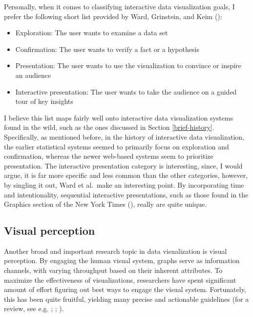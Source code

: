 \documentclass[
  openany]{book}
\providecommand{\tightlist}{%
  \setlength{\itemsep}{0pt}\setlength{\parskip}{0pt}}
\theoremstyle{definition}
\theoremstyle{definition}
\theoremstyle{definition}
\theoremstyle{definition}
\theoremstyle{remark}
\begin{document}
Personally, when it comes to classifying interactive data visualization goals, I prefer the following short list provided by Ward, Grinstein, and Keim ():

\begin{itemize}
\tightlist
\item
  Exploration: The user wants to examine a data set
\item
  Confirmation: The user wants to verify a fact or a hypothesis
\item
  Presentation: The user wants to use the visualization to convince or inspire an audience
\item
  Interactive presentation: The user wants to take the audience on a guided tour of key insights
\end{itemize}

I believe this list maps fairly well onto interactive data visualization systems found in the wild, such as the ones discussed in Section \ref{brief-history}. Specifically, as mentioned before, in the history of interactive data visualization, the earlier statistical systems seemed to primarily focus on exploration and confirmation, whereas the newer web-based systems seem to prioritize presentation. The interactive presentation category is interesting, since, I would argue, it is far more specific and less common than the other categories, however, by singling it out, Ward et al.~make an interesting point. By incorporating time and intentionality, sequential interactive presentations, such as those found in the Graphics section of the New York Times (), really are quite unique.

\subsection{Visual perception}\label{visual-perception}

Another broad and important research topic in data visualization is visual perception. By engaging the human visual system, graphs serve as information channels, with varying throughput based on their inherent attributes. To maximize the effectiveness of visualizations, researchers have spent significant amount of effort figuring out best ways to engage the visual system. Fortunately, this has been quite fruitful, yielding many precise and actionable guidelines (for a review, see e.g. ; ; ).
\end{document}

